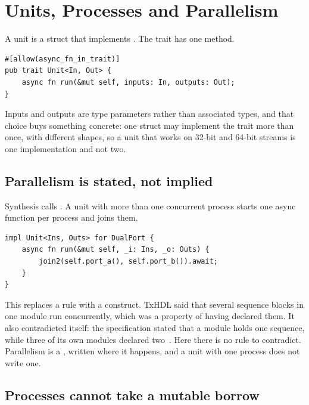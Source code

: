 \section{Units, Processes and Parallelism}
\label{sec:e-units}

A unit is a struct that implements . The trait
has one method.

\begin{lstlisting}[caption={The unit trait. Inputs and outputs are type parameters, so one struct may implement it more than once.},label={lst:module}]
#[allow(async_fn_in_trait)]
pub trait Unit<In, Out> {
    async fn run(&mut self, inputs: In, outputs: Out);
}
\end{lstlisting}

Inputs and outputs are type parameters rather than associated types, and
that choice buys something concrete: one struct may implement the trait
more than once, with different shapes, so a unit that works on 32-bit and
64-bit streams is one implementation and not two.

\subsection{Parallelism is stated, not implied}

Synthesis calls . A unit with more than one concurrent process
starts one async function per process and joins them.

\begin{lstlisting}[caption={Parallelism written down. A unit with one process writes no join.},label={lst:join}]
impl Unit<Ins, Outs> for DualPort {
    async fn run(&mut self, _i: Ins, _o: Outs) {
        join2(self.port_a(), self.port_b()).await;
    }
}
\end{lstlisting}

This replaces a rule with a construct. TxHDL said that several sequence
blocks in one module run concurrently, which was a property of having
declared them. It also contradicted itself: the specification stated that a
module holds one sequence, while three of its own modules declared
two~\cite{unification}. Here there is no rule to contradict. Parallelism is
a , written where it happens, and a unit with one process does
not write one.

\subsection{Processes cannot take a mutable borrow}

